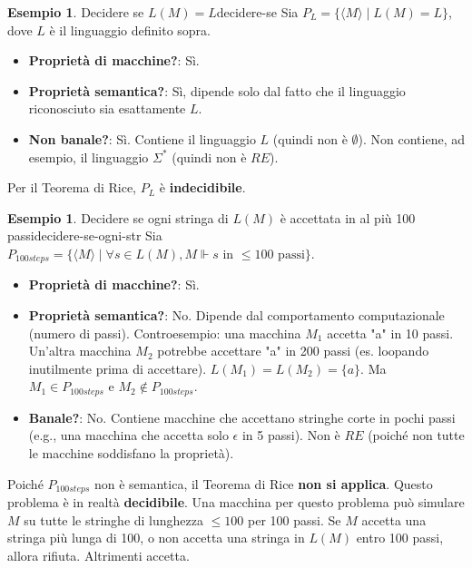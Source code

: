 \documentclass[a4paper]{article}
\theoremstyle{definition} %
\newtheorem{example}[theorem]{Esempio}
\begin{document}
\begin{example}{Decidere se $L(M)=L$}{decidere-se}
Sia $P_L = \{\langle M \rangle \mid L(M) = L\}$, dove $L$ è il linguaggio definito sopra.
\begin{itemize}
    \item \textbf{Proprietà di macchine?}: Sì.
    \item \textbf{Proprietà semantica?}: Sì, dipende solo dal fatto che il linguaggio riconosciuto sia esattamente $L$.
    \item \textbf{Non banale?}: Sì. Contiene il linguaggio $L$ (quindi non è $\emptyset$). Non contiene, ad esempio, il linguaggio $\Sigma^*$ (quindi non è $RE$).
\end{itemize}
Per il Teorema di Rice, $P_L$ è \textbf{indecidibile}.
\end{example}

\begin{example}{Decidere se ogni stringa di $L(M)$ è accettata in al più 100 passi}{decidere-se-ogni-str}
Sia $P_{100steps} = \{\langle M \rangle \mid \forall s \in L(M), M \Vdash s \text{ in } \le 100 \text{ passi}\}$.
\begin{itemize}
    \item \textbf{Proprietà di macchine?}: Sì.
    \item \textbf{Proprietà semantica?}: No. Dipende dal comportamento computazionale (numero di passi). Controesempio: una macchina $M_1$ accetta "a" in 10 passi. Un'altra macchina $M_2$ potrebbe accettare "a" in 200 passi (es. loopando inutilmente prima di accettare). $L(M_1) = L(M_2) = \{a\}$. Ma $M_1 \in P_{100steps}$ e $M_2 \notin P_{100steps}$.
    \item \textbf{Banale?}: No. Contiene macchine che accettano stringhe corte in pochi passi (e.g., una macchina che accetta solo $\epsilon$ in 5 passi). Non è $RE$ (poiché non tutte le macchine soddisfano la proprietà).
\end{itemize}
Poiché $P_{100steps}$ non è semantica, il Teorema di Rice \textbf{non si applica}. Questo problema è in realtà \textbf{decidibile}. Una macchina per questo problema può simulare $M$ su tutte le stringhe di lunghezza $\le 100$ per 100 passi. Se $M$ accetta una stringa più lunga di 100, o non accetta una stringa in $L(M)$ entro 100 passi, allora rifiuta. Altrimenti accetta.
\end{example}
\end{document}
